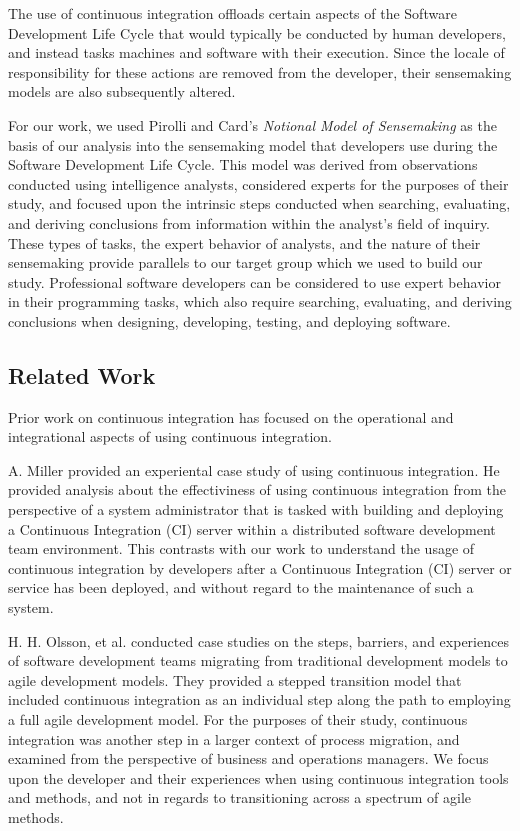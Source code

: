 \documentclass{sig-alternate}
\begin{document}
The use of continuous integration offloads certain aspects of the Software Development Life Cycle that would typically be conducted by human developers, and instead tasks machines and software with their execution. Since the locale of responsibility for these actions are removed from the developer, their sensemaking models are also subsequently altered.

For our work, we used Pirolli and Card's \textit{Notional Model of Sensemaking}\cite{pirolli:sensemaking} as the basis of our analysis into the sensemaking model that developers use during the Software Development Life Cycle. This model was derived from observations conducted using intelligence analysts, considered experts for the purposes of their study, and focused upon the intrinsic steps conducted when searching, evaluating, and deriving conclusions from information within the analyst's field of inquiry. These types of tasks, the expert behavior of analysts, and the nature of their sensemaking provide parallels to our target group which we used to build our study. Professional software developers can be considered to use expert behavior in their programming tasks, which also require searching, evaluating, and deriving conclusions when designing, developing, testing, and deploying software.

\subsection{Related Work}

Prior work on continuous integration has focused on the operational and integrational aspects of using continuous integration.

A. Miller\cite{miller:hundreddays} provided an experiental case study of using continuous integration. He provided analysis about the effectiviness of using continuous integration from the perspective of a system administrator that is tasked with building and deploying a Continuous Integration (CI) server within a distributed software development team environment. This contrasts with our work to understand the usage of continuous integration by developers after a Continuous Integration (CI) server or service has been deployed, and without regard to the maintenance of such a system.

H. H. Olsson, et al.\cite{olsson:climbingstairway} conducted case studies on the steps, barriers, and experiences of software development teams migrating from traditional development models to agile development models. They provided a stepped transition model that included continuous integration as an individual step along the path to employing a full agile development model. For the purposes of their study, continuous integration was another step in a larger context of process migration, and examined from the perspective of business and operations managers. We focus upon the developer and their experiences when using continuous integration tools and methods, and not in regards to transitioning across a spectrum of agile methods.
\end{document}
